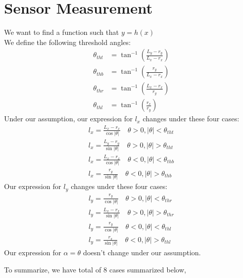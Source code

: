 \documentclass[12pt, letterpaper]{amsart} %
\numberwithin{equation}{section}
\begin{document}
\section{Sensor Measurement}
We want to find a function such that $y = h(x)$ \\
We define the following threshold angles:
\begin{align*}
  \theta_{tht} &= \tan^{-1}(\frac{L_y - r_y}{L_x - r_x}) \\
  \theta_{thb} &= \tan^{-1}(\frac{r_y}{L_x - r_x}) \\
  \theta_{thr} &= \tan^{-1}(\frac{L_x-r_x}{r_y}) \\
  \theta_{thl} &= \tan^{-1}(\frac{r_x}{r_y})
\end{align*}
Under our assumption, our expression for $l_x$  changes under these four cases:
\begin{align*}
  l_x = \frac{L_x - r_x}{\cos |\theta|} \quad \theta > 0, |\theta| < \theta_{tht} \\
  l_x = \frac{L_y - r_y}{\sin|\theta|} \quad \theta > 0, |\theta| > \theta_{tht} \\
  l_x = \frac{L_x - r_x}{\cos |\theta|} \quad \theta < 0, |\theta| < \theta_{thb} \\
  l_x = \frac{r_y}{\sin|\theta|} \quad \theta < 0, |\theta| > \theta_{thb}
\end{align*}
Our expression for $l_y$ changes under these four cases:
\begin{align*}
  l_y = \frac{r_y}{\cos |\theta|} \quad \theta > 0, |\theta| < \theta_{thr} \\
  l_y = \frac{L_x - r_x}{\sin |\theta|} \quad \theta > 0, |\theta| > \theta_{thr} \\
  l_y = \frac{r_y}{\cos |\theta|} \quad \theta < 0, |\theta| < \theta_{thl} \\
  l_y = \frac{r_x}{\sin |\theta|} \quad \theta < 0, |\theta| > \theta_{thl}
\end{align*}
Our expression for $\alpha = \theta$ doesn't change under our assumption. \par
To summarize, we have total of 8 cases summarized below,
\end{document}
